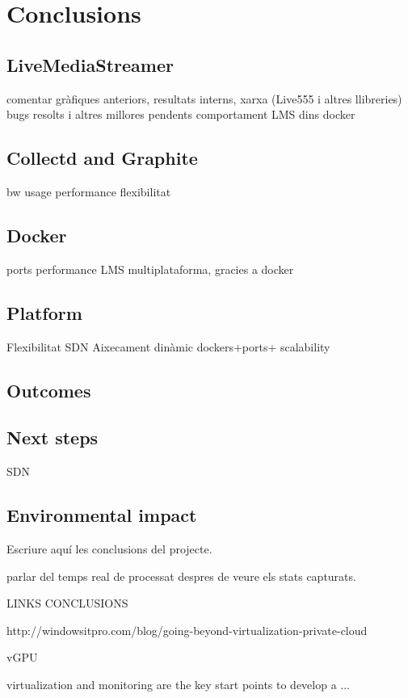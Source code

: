 \cleardoublepage
{}
\chapter*{Conclusions}\label{C:conclusions}

\section{LiveMediaStreamer}
comentar gràfiques anteriors, resultats interns, 
xarxa (Live555 i altres llibreries)
bugs resolts i altres millores pendents
comportament LMS dins docker

\section{Collectd and Graphite}
bw usage
performance
flexibilitat

\section{Docker}
ports
performance
LMS multiplataforma, gracies a docker

\section{Platform}
Flexibilitat
SDN
Aixecament dinàmic dockers+ports+ scalability

\section{Outcomes}


\section{Next steps}
SDN

\section{Environmental impact}

Escriure aquí les conclusions del projecte. 

parlar del temps real de processat despres de veure els stats capturats.

LINKS CONCLUSIONS

http://windowsitpro.com/blog/going-beyond-virtualization-private-cloud

vGPU

virtualization and monitoring are the key start points to develop a ...

